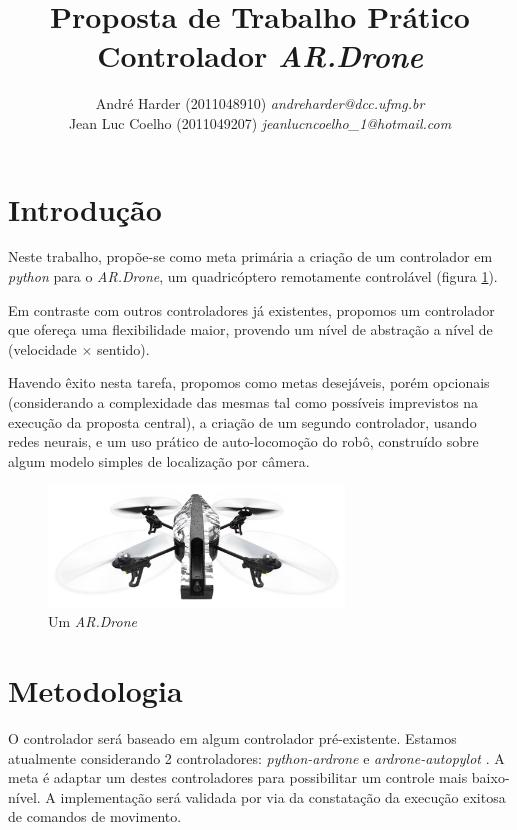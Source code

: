 \documentclass[12pt, a4paper]{article}
\author{
	André Harder (2011048910) \emph{andreharder@dcc.ufmg.br}\\
	Jean Luc Coelho (2011049207) \emph{jeanlucncoelho\_1@hotmail.com} \\
}
\title{
	Proposta de Trabalho Prático \\
	Controlador \emph{AR.Drone}
}
\date{}
\begin{document}
\maketitle

\section{Introdução}

Neste trabalho, propõe-se como meta primária a criação de um controlador em \emph{python} para o \emph{AR.Drone}, um quadricóptero remotamente controlável (figura \ref{figARDrone}).

Em contraste com outros controladores já existentes, propomos um controlador que ofereça uma flexibilidade maior, provendo um nível de abstração a nível de (velocidade  $\times$ sentido).

Havendo êxito nesta tarefa, propomos como metas desejáveis, porém opcionais (considerando a complexidade das mesmas tal como possíveis imprevistos na execução da proposta central), a criação de um segundo controlador, usando redes neurais, e um uso prático de auto-locomoção do robô, construído sobre algum modelo simples de localização por câmera.

\begin{figure}
	\centering
	\includegraphics[width=0.7\textwidth]{images/ARDrone.jpg}
	\caption{Um \emph{AR.Drone}}
	\label{figARDrone}
\end{figure}

\section{Metodologia}

O controlador será baseado em algum controlador pré-existente. Estamos atualmente considerando 2 controladores: \emph{python-ardrone} \cite{pythonArdrone} e \emph{ardrone-autopylot} \cite{ardroneAutopylot}. A meta é adaptar um destes controladores para possibilitar um controle mais baixo-nível. A implementação será validada por via da constatação da execução exitosa de comandos de movimento.
\end{document}

